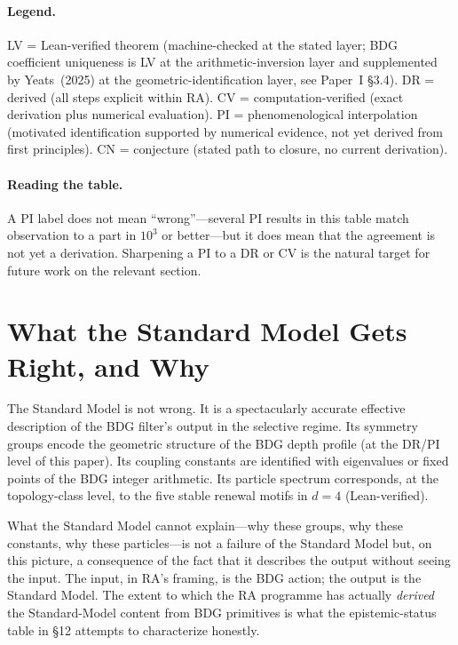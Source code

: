 \documentclass[11pt]{article}
\begin{document}
\paragraph{Legend.} LV = Lean-verified theorem (machine-checked at the stated layer; BDG coefficient uniqueness is LV at the arithmetic-inversion layer and supplemented by Yeats~(2025) at the geometric-identification layer, see Paper~I \S3.4). DR = derived (all steps explicit within RA). CV = computation-verified (exact derivation plus numerical evaluation). PI = phenomenological interpolation (motivated identification supported by numerical evidence, not yet derived from first principles). CN = conjecture (stated path to closure, no current derivation).

\paragraph{Reading the table.} A PI label does not mean ``wrong''---several PI results in this table match observation to a part in $10^3$ or better---but it does mean that the agreement is not yet a derivation. Sharpening a PI to a DR or CV is the natural target for future work on the relevant section.

\section{What the Standard Model Gets Right, and Why}
\label{sec:sm}

The Standard Model is not wrong. It is a spectacularly accurate effective description of the BDG filter's output in the selective regime. Its symmetry groups encode the geometric structure of the BDG depth profile (at the DR/PI level of this paper). Its coupling constants are identified with eigenvalues or fixed points of the BDG integer arithmetic. Its particle spectrum corresponds, at the topology-class level, to the five stable renewal motifs in $d=4$ (Lean-verified).

What the Standard Model cannot explain---why these groups, why these constants, why these particles---is not a failure of the Standard Model but, on this picture, a consequence of the fact that it describes the output without seeing the input. The input, in RA's framing, is the BDG action; the output is the Standard Model. The extent to which the RA programme has actually \emph{derived} the Standard-Model content from BDG primitives is what the epistemic-status table in \S12 attempts to characterize honestly.
\end{document}
